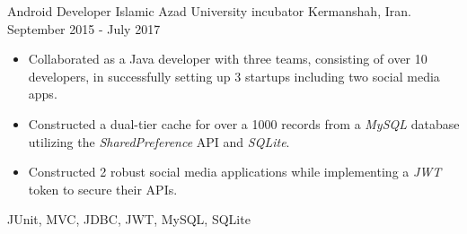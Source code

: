 \begin{experiences}
\experience
{}
{Android Developer}
{Islamic Azad University incubator}
{Kermanshah, Iran. \hspace{60 pt} September 2015 - July 2017}
{}
{
\begin{itemize}
\item Collaborated as a Java developer with three teams, consisting of over 10 developers, in successfully setting up 3 startups including two social media apps.
\item Constructed a dual-tier cache for over a 1000 records from a \emph{MySQL} database utilizing the \emph{SharedPreference} API and \emph{SQLite}.
\item Constructed 2 robust social media applications while implementing a \emph{JWT} token to secure their APIs.
\end{itemize}
}{JUnit, MVC, JDBC, JWT, MySQL, SQLite}
\end{experiences}